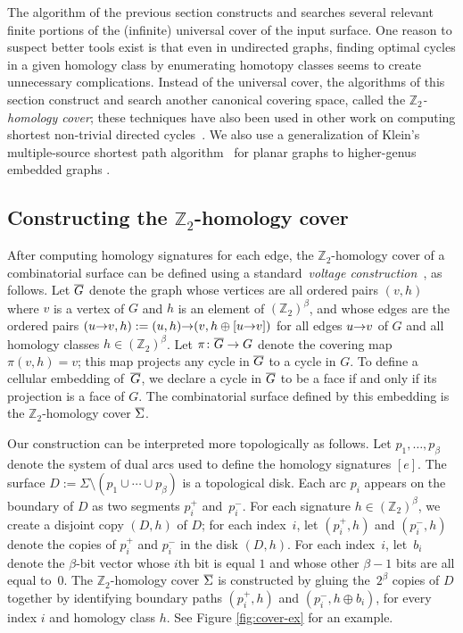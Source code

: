 \documentclass[11pt,twoside]{article}
\def\arcto{\mathord\shortrightarrow}
\def\arc#1#2{#1\arcto#2}
\def\Z{\mathbb{Z}}
\def\dualarc{p}
\def\Sigmabar{\overline{\smash{\Sigma}\vphantom{t}}}
\def\Gbar{\overline{\smash{G}\vphantom{t}}}
\begin{document}

The algorithm of the previous section constructs and searches several relevant finite portions of the (infinite) universal cover of the input surface.  One reason to suspect better tools exist is that even in undirected graphs, finding optimal cycles in a given homology class by enumerating homotopy classes seems to create unnecessary complications.  
Instead of the universal cover, the algorithms of this section construct and search another canonical covering space, called the \emph{$\Z_2$-homology cover}; these techniques have also been used in other work on computing shortest non-trivial directed cycles~\cite{e-sncds-11,f-sntcd-13}.
We also use a generalization of Klein's multiple-source shortest path algorithm~\cite{k-msspp-05} for planar graphs to higher-genus embedded graphs \cite{cce-msspe-13}.


\subsection{Constructing the $\Z_2$-homology cover}
\label{sec:homcover_cover}
After computing homology signatures for each edge, the $\Z_2$-homology cover of a combinatorial surface can be defined using a standard~\emph{voltage construction}~\cite[Chapter 4]{gt-tgt-01}, as follows.  Let $\Gbar$ denote the graph whose vertices are all ordered pairs $(v, h)$ where $v$ is a vertex of $G$ and $h$ is an element of $(\Z_2)^\beta$, and whose edges are the ordered pairs $(\arc{u}{v}, h) := (u, h)\arcto(v, h\oplus [u\arcto v])$ for all edges $\arc{u}{v}$ of $G$ and all homology classes $h \in (\Z_2)^\beta$.  Let $\pi\colon \Gbar\to G$ denote the covering map $\pi(v, h) = v$; this map projects any cycle in $\Gbar$ to a cycle in $G$.  To define a cellular embedding of~$\Gbar$, we declare a cycle in $\Gbar$ to be a face if and only if its projection is a face of $G$.  The combinatorial surface defined by this embedding is the $\Z_2$-homology cover $\Sigmabar$.

Our construction can be interpreted more topologically as follows.  Let $\dualarc_1, \dots, \dualarc_\beta$ denote the system of dual arcs used to define the homology signatures $[e]$.  The surface $D := \Sigma\setminus(\dualarc_1\cup\cdots\cup \dualarc_\beta)$ is a topological disk.  Each arc $\dualarc_i$ appears on the boundary of $D$ as two segments $\dualarc^+_i$ and~$\dualarc^-_i$.  For each signature $h\in (\Z_2)^\beta$, we create a disjoint copy $(D,h)$ of $D$; for each index~$i$, let $(\dualarc^+_i, h)$ and $(\dualarc^-_i, h)$ denote the copies of $\dualarc^+_i$ and $\dualarc^-_i$ in the disk $(D, h)$.  For each index~$i$, let~$b_i$ denote the $\beta$-bit vector whose $i$th bit is equal $1$ and whose other $\beta-1$ bits are all equal to~$0$.  The $\Z_2$-homology cover $\Sigmabar$ is constructed by gluing the~$2^\beta$ copies of $D$ together by identifying boundary paths $(\dualarc^+_i,h)$ and $(\dualarc^-_i, h\oplus b_i)$, for every index $i$ and homology class $h$.  See Figure \ref{fig:cover-ex} for an example.
\end{document}
